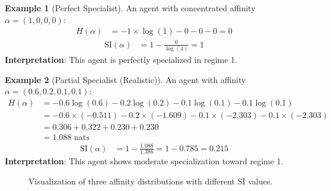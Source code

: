 \documentclass[11pt,a4paper]{article}
\theoremstyle{definition}
\newtheorem{example}{Example}[section]
\theoremstyle{plain}
\newcommand{\SI}{\text{SI}}
\begin{document}
\begin{example}[Perfect Specialist]
An agent with concentrated affinity $\alpha = (1, 0, 0, 0)$:
\begin{align}
H(\alpha) &= -1 \times \log(1) - 0 - 0 - 0 = 0
\end{align}
\begin{align}
\SI(\alpha) &= 1 - \frac{0}{\log(4)} = 1
\end{align}
\textbf{Interpretation}: This agent is perfectly specialized in regime 1.
\end{example}

\begin{example}[Partial Specialist (Realistic)]
An agent with affinity $\alpha = (0.6, 0.2, 0.1, 0.1)$:
\begin{align}
H(\alpha) &= -0.6\log(0.6) - 0.2\log(0.2) - 0.1\log(0.1) - 0.1\log(0.1) \\
&= -0.6 \times (-0.511) - 0.2 \times (-1.609) - 0.1 \times (-2.303) - 0.1 \times (-2.303) \\
&= 0.306 + 0.322 + 0.230 + 0.230 \\
&= 1.088 \text{ nats}
\end{align}
\begin{align}
\SI(\alpha) &= 1 - \frac{1.088}{1.386} = 1 - 0.785 = 0.215
\end{align}
\textbf{Interpretation}: This agent shows moderate specialization toward regime 1.
\end{example}

\begin{figure}[h]
\centering
{}
\caption{Visualization of three affinity distributions with different SI values.}
\end{figure}
\end{document}
